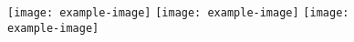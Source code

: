 \documentclass{beamer}
\begin{document}
    \begin{frame}
        \begin{figure}
            \texttt{[image: example-image]}
            \hfill
            \texttt{[image: example-image]}
            \hfill
            \texttt{[image: example-image]}
        \end{figure}
    \end{frame} 
\end{document}
